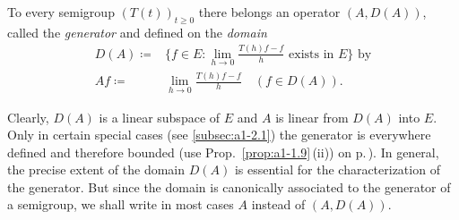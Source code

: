 \begin{definition}\label{def:a1-1.5}
To every semigroup $(T(t))_{t \geq 0}$ there belongs an operator $(A,D(A))$, called the \emph{generator} and defined on the \emph{domain}
\begin{align*}
	D(A) \coloneqq{} & \{f \in E \colon \lim_{h\to0} \frac{T(h)f - f}{h} \text{ exists in $E$}\} \text{ by} \\
	Af \coloneqq{} & \lim_{h\to0} \frac{T(h)f - f}{h} \quad (f \in D(A)).
\end{align*}
\end{definition}
\noindent Clearly, $D(A)$ is a linear subspace of $E$ and $A$ is linear from $D(A)$ into $E$.
Only in certain special cases (see \ref{subsec:a1-2.1}) the generator
is everywhere defined and therefore bounded (use Prop.~\ref{prop:a1-1.9}\,(ii)) on p.\,\pageref{prop:a1-1.9}). %
In general, the precise extent of the domain $D(A)$ is essential for the characterization of the generator.
But since the domain is canonically associated to the generator of a semigroup, we shall write in most cases $A$ instead of $(A,D(A))$.

